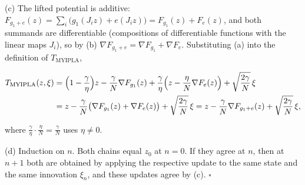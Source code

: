 \documentclass[11pt,a4paper]{report}
\begin{document}
(c) The lifted potential is additive: \(F_{g_1+e}(z)=\sum_i\bigl(g_1(J_iz)+e(J_iz)\bigr)=F_{g_1}(z)+F_e(z)\), and both summands are differentiable (compositions of differentiable functions with the linear maps \(J_i\)), so by (b) \(\nabla F_{g_1+e}=\nabla F_{g_1}+\nabla F_e\). Substituting (a) into the definition of \(T_{\mathrm{MYIPLA}}\),


\[\begin{aligned}
T_{\mathrm{MYIPLA}}(z,\xi)&=\Bigl(1-\frac\gamma\eta\Bigr)z-\frac\gamma N\nabla F_{g_1}(z)+\frac\gamma\eta\Bigl(z-\frac\eta N\nabla F_e(z)\Bigr)+\sqrt{\frac{2\gamma}N}\,\xi\\
&=z-\frac\gamma N\bigl(\nabla F_{g_1}(z)+\nabla F_e(z)\bigr)+\sqrt{\frac{2\gamma}N}\,\xi=z-\frac\gamma N\nabla F_{g_1+e}(z)+\sqrt{\frac{2\gamma}N}\,\xi,
\end{aligned}\]


where \(\frac\gamma\eta\cdot\frac\eta N=\frac\gamma N\) uses \(\eta\ne0\).




(d) Induction on \(n\). Both chains equal \(z_0\) at \(n=0\). If they agree at \(n\), then at \(n+1\) both are obtained by applying the respective update to the same state and the same innovation \(\xi_n\), and these updates agree by (c). \(\square\)
\end{document}
